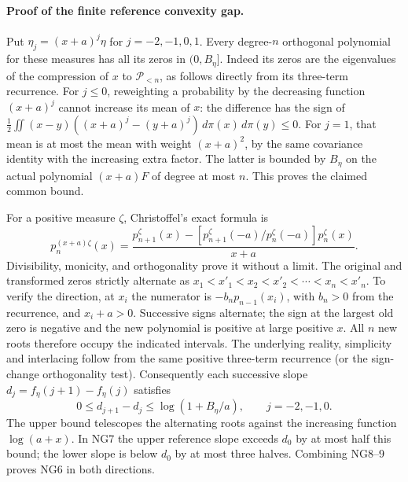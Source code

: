 \documentclass[11pt]{article}
\newcommand{\PP}{\mathcal P}\newcommand{\dd}{\,d}
\begin{document}
\paragraph{Proof of the finite reference convexity gap.}
Put $\eta_j=(x+a)^j\eta$ for $j=-2,-1,0,1$.
Every degree-$n$ orthogonal polynomial for these measures has all its
zeros in $(0,B_\eta]$. Indeed its zeros are the eigenvalues of the
compression of $x$ to $\PP_{<n}$, as follows directly from its three-term
recurrence. For $j\le0$, reweighting a probability by the decreasing
function $(x+a)^j$ cannot increase its mean of $x$: the difference
has the sign of
$\frac12\iint(x-y)((x+a)^j-(y+a)^j)\dd\pi(x)\dd\pi(y)\le0$.
For $j=1$, that mean is at most the mean with weight $(x+a)^2$, by
the same covariance identity with the increasing extra factor. The
latter is bounded by $B_\eta$ on the actual polynomial $(x+a)F$ of
degree at most $n$. This proves the claimed common bound.

For a positive measure $\zeta$, Christoffel's exact formula is
\[
 p_n^{(x+a)\zeta}(x)=
 \frac{p_{n+1}^{\zeta}(x)-
       [p_{n+1}^{\zeta}(-a)/p_n^{\zeta}(-a)]p_n^{\zeta}(x)}{x+a}.
\]
Divisibility, monicity, and orthogonality prove it without a limit.
The original and transformed zeros strictly alternate as
$x_1<x'_1<x_2<x'_2<\cdots<x_n<x'_n$.
To verify the direction, at $x_i$ the numerator is
$-b_n p_{n-1}(x_i)$, with $b_n>0$ from the recurrence, and $x_i+a>0$.
Successive signs alternate; the sign at the largest old zero is
negative and the new polynomial is positive at large positive $x$.
All $n$ new roots therefore occupy the indicated intervals. The
underlying reality, simplicity and interlacing follow from the same
positive three-term recurrence (or the sign-change orthogonality test).
Consequently each successive slope
$d_j=f_\eta(j+1)-f_\eta(j)$ satisfies
\[
 0\le d_{j+1}-d_j\le\log(1+B_\eta/a),\qquad j=-2,-1,0.
\]
The upper bound telescopes the alternating roots against the increasing
function $\log(a+x)$. In NG7 the upper reference slope exceeds $d_0$
by at most half this bound; the lower slope is below $d_0$ by at most
three halves. Combining NG8--9 proves NG6 in both directions.
\end{document}
